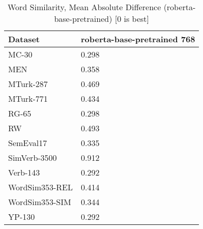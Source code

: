 \begin{table}[]
\centering
\begin{tabular}{l|l}
\hline
Dataset & roberta-base-pretrained 768 \\
\hline
MC-30 & 0.298 \\ 
MEN & 0.358 \\ 
MTurk-287 & 0.469 \\ 
MTurk-771 & 0.434 \\ 
RG-65 & 0.298 \\ 
RW & 0.493 \\ 
SemEval17 & 0.335 \\ 
SimVerb-3500 & 0.912 \\ 
Verb-143 & 0.292 \\ 
WordSim353-REL & 0.414 \\ 
WordSim353-SIM & 0.344 \\ 
YP-130 & 0.292
\end{tabular}
\caption{Word Similarity, Mean Absolute Difference (roberta-base-pretrained) [0 is best]}
\label{tab:similarity-roberta-base-pretrained}
\end{table}
